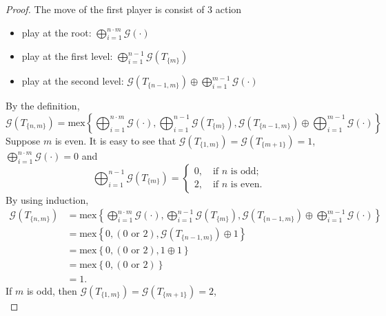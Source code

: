 \documentclass[12pt]{elsarticle}
\newtheorem*{theorem A}{Theorem A}
\newtheorem*{theorem B}{N\"olker's Theorem}
\theoremstyle{remark}
\theoremstyle{remark}
\theoremstyle{definition}
\begin{document}
\begin{proof}
	The move of the first player is consist of 3 action
	\begin{itemize}
		\item play at the root: $\bigoplus_{i=1}^{n\cdot m}\mathcal{G}\left(\cdot\right)$
		\item play at the first level: $\bigoplus_{i=1}^{n-1}\mathcal{G}\left(T_{\{m\}}\right)$
		\item play at the second level: $\mathcal{G}\left(T_{\{n-1,m\}}\right) \oplus \bigoplus_{i=1}^{m-1}\mathcal{G}\left(\cdot\right)$
	\end{itemize}
	By the definition,
	\begin{equation*}
		\mathcal{G}\left(T_{\{n,m\}}\right) = \mathrm{mex}\left\{\bigoplus_{i=1}^{n\cdot m}\mathcal{G}\left(\cdot\right), \bigoplus_{i=1}^{n-1}\mathcal{G}\left(T_{\{m\}}\right), \mathcal{G}\left(T_{\{n-1,m\}}\right) \oplus \bigoplus_{i=1}^{m-1}\mathcal{G}\left(\cdot\right)\right\}
	\end{equation*}
	Suppose $m$ is even. It is easy to see that $\mathcal{G}\left(T_{\{1,m\}}\right) = \mathcal{G}\left(T_{\{m+1\}}\right) =  1$, $\bigoplus_{i=1}^{n\cdot m}\mathcal{G}\left(\cdot\right) = 0$ and
	\begin{equation*}
		\bigoplus_{i=1}^{n-1}\mathcal{G}\left(T_{\{m\}}\right) = \begin{cases}
			0,	\quad \text{if $n$ is odd};\\
			2,	\quad \text{if $n$ is even}.
		\end{cases}
	\end{equation*} By using induction,
	\begin{align*}
		\mathcal{G}\left(T_{\{n,m\}}\right) &= \mathrm{mex}\left\{\bigoplus_{i=1}^{n\cdot m}\mathcal{G}\left(\cdot\right), \bigoplus_{i=1}^{n-1}\mathcal{G}\left(T_{\{m\}}\right), \mathcal{G}\left(T_{\{n-1,m\}}\right) \oplus \bigoplus_{i=1}^{m-1}\mathcal{G}\left(\cdot\right)\right\}\\
		&= \mathrm{mex}\left\{0, (0 \text{ or } 2), \mathcal{G}\left(T_{\{n-1,m\}}\right) \oplus  1\right\}\\
		&= \mathrm{mex}\left\{0, (0 \text{ or } 2), 1 \oplus  1\right\}\\
		&= \mathrm{mex}\left\{0, (0 \text{ or } 2)\right\}\\
		&= 1.
	\end{align*}
	If $m$ is odd, then $\mathcal{G}\left(T_{\{1,m\}}\right) = \mathcal{G}\left(T_{\{m+1\}}\right) =  2$,
	\begin{equation*}

\end{equation*}
\end{proof}
\end{document}
